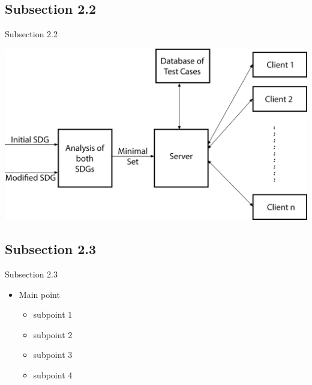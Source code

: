	\subsection{Subsection 2.2}
		\begin{tframe}{Subsection 2.2}
			\begin{center}
				\includegraphics[scale=0.35]{Diagrams/da.png}
			\end{center}
		\end{tframe}
	\subsection{Subsection 2.3}
		\begin{tframe}{Subsection 2.3}
			\begin{itemize}
				\item Main point
				\begin{itemize}
					\item subpoint 1
					\item subpoint 2
					\item subpoint 3
					\item subpoint 4
				\end{itemize}
			\end{itemize}
		\end{tframe}
		
